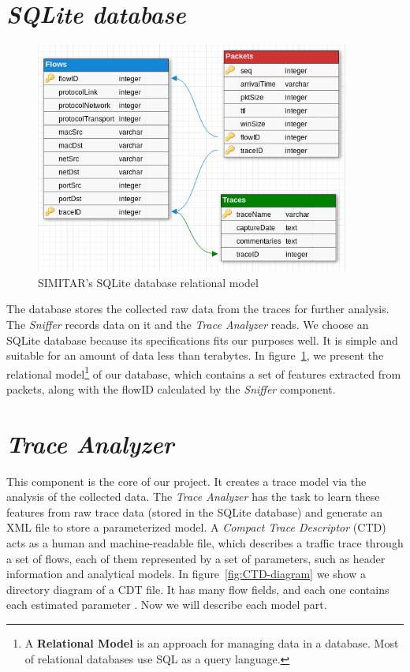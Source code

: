 \section{ \textit{SQLite database} }

\begin{figure}[ht!]
        \centering
        \includegraphics[height=3.0in]{figures/ch3/database-relational-model}
        \caption{SIMITAR's SQLite database relational model}
    \label{fig:simitar-database}
\end{figure}




The database stores the collected raw data from the traces for further analysis. The \textit{Sniffer} records data on it and the  \textit{Trace Analyzer} reads. We choose an SQLite database because its specifications\cite{web-sqlite} fits our purposes well. It is simple and suitable for an amount of data less than terabytes. In figure~\ref{fig:simitar-database}, we present the relational model\footnote{A \textbf{Relational Model} is an approach for managing data in a database. Most of relational databases use \acrshort{SQL} as a query language\cite{ database-book}.} of our database, which contains a set of features extracted from packets, along with the flowID calculated by the \textit{Sniffer} component.


\section{ \textit{Trace Analyzer} }


This component is the core of our project. It creates a trace model via the analysis of the collected data. The \textit{Trace Analyzer} has the task to learn these features from raw trace data (stored in the SQLite database) and generate an XML file to store a parameterized model. A \textit{Compact Trace Descriptor} (CTD) acts as a human and machine-readable file, which describes a traffic trace through a set of flows, each of them represented by a set of parameters, such as header information and analytical models. In figure~\ref{fig:CTD-diagram} we show a directory diagram of a CDT file. It has many flow fields, and each one contains each estimated parameter . Now we will describe each model part. 


